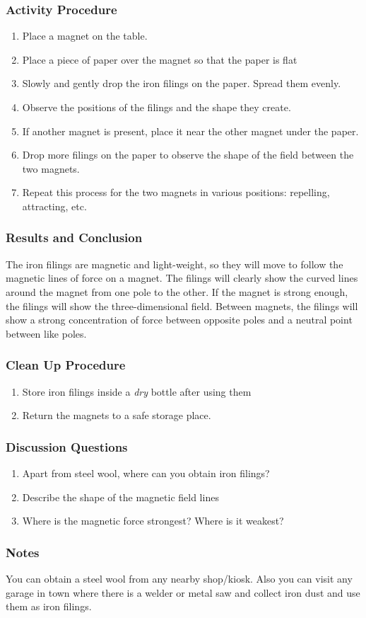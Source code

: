 \subsubsection*{Activity Procedure}
\begin{enumerate}
\item{Place a magnet on the table.}
\item{Place a piece of paper over the magnet so that the paper is flat}
\item{Slowly and gently drop the iron filings on the paper.  Spread them evenly.}
\item{Observe the positions of the filings and the shape they create.}
\item{If another magnet is present, place it near the other magnet under the paper.}
\item{Drop more filings on the paper to observe the shape of the field between the two magnets.}
\item{Repeat this process for the two magnets in various positions: repelling, attracting, etc.}
\end{enumerate}

\subsubsection*{Results and Conclusion}
The iron filings are magnetic and light-weight, so they will move to follow the magnetic lines of force on a magnet.  The filings will clearly show the curved lines around the magnet from one pole to the other.  If the magnet is strong enough, the filings will show the three-dimensional field.
Between magnets, the filings will show a strong concentration of force between opposite poles and a neutral point between like poles.

\subsubsection*{Clean Up Procedure}
\begin{enumerate}
\item{Store iron filings inside a \textit{dry} bottle after using them}
\item{Return the magnets to a safe storage place.}
\end{enumerate}

\subsubsection*{Discussion Questions}
\begin{enumerate}
\item{Apart from steel wool, where can you obtain iron filings?}
\item{Describe the shape of the magnetic field lines}
\item{Where is the magnetic force strongest?  Where is it weakest?}
\end{enumerate}

\subsubsection*{Notes}
You can obtain a steel wool from any nearby shop/kiosk. Also you can visit any garage in town where there is a welder or metal saw and collect iron dust and use them as iron filings.
